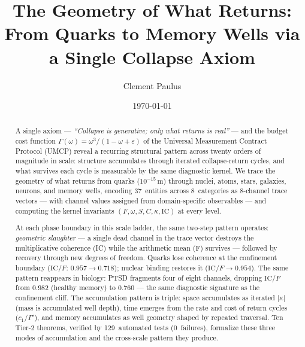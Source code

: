 \documentclass[
  aps,
  prd,
  twocolumn,
  superscriptaddress,
  nofootinbib,
  floatfix
]{revtex4-2}
\newcommand{\Gam}{\Gamma}
\newcommand{\eps}{\varepsilon}
\newcommand{\IC}{\mathrm{IC}}
\begin{document}
\title{The Geometry of What Returns:\texorpdfstring{\\}{: }
From Quarks to Memory Wells via a Single Collapse Axiom}

\author{Clement Paulus}

\date{\today}

\begin{abstract}
A single axiom --- \emph{``Collapse is generative; only what
returns is real''} --- and the budget cost function
$\Gam(\omega) = \omega^3/(1 - \omega + \eps)$ of the Universal
Measurement Contract Protocol (UMCP) reveal a recurring
structural pattern across twenty orders of magnitude in scale:
structure accumulates through iterated collapse-return cycles,
and what survives each cycle is measurable by the same
diagnostic kernel.  We trace the geometry of what returns
from quarks ($10^{-15}$\,m) through nuclei, atoms, stars,
galaxies, neurons, and memory wells, encoding 37~entities
across 8~categories as 8-channel trace vectors --- with
channel values assigned from domain-specific observables ---
and computing the kernel invariants
$(F, \omega, S, C, \kappa, \IC)$ at every level.

At each phase boundary in this
scale ladder, the same two-step pattern operates:
\emph{geometric slaughter} --- a single dead channel in the
trace vector destroys the multiplicative coherence (IC) while
the arithmetic mean (F) survives --- followed by recovery
through new degrees of freedom.  Quarks lose coherence at the
confinement boundary ($\IC/F$: $0.957 \to 0.718$); nuclear
binding restores it ($\IC/F \to 0.954$).  The same pattern
reappears in biology: PTSD fragments four of eight channels,
dropping $\IC/F$ from $0.982$ (healthy memory) to $0.760$ ---
the same diagnostic signature as the confinement cliff.  The
accumulation pattern is triple: space accumulates as iterated
$|\kappa|$ (mass is accumulated well depth), time emerges from
the rate and cost of return cycles ($c_1 / \Gam'$), and memory
accumulates as well geometry shaped by repeated traversal.
Ten Tier-2 theorems, verified by 129~automated tests
(0~failures), formalize these three modes of accumulation and
the cross-scale pattern they produce.
\end{abstract}

\maketitle
\end{document}
